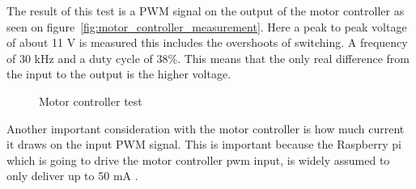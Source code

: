 The result of this test is a PWM signal on the output of the motor controller as seen on figure~\ref{fig:motor_controller_measurement}. Here a peak to peak voltage of about 11 V is measured this includes the overshoots of switching. A frequency of 30 kHz and a duty cycle of 38\%. This means that the only real difference from the input to the output is the higher voltage.
\begin{figure}[H]
	\centering
	\hfill
	\hfill
	\caption{Motor controller test}
\end{figure}

Another important consideration with the motor controller is how much current it draws on the input PWM signal. This is important because the Raspberry pi which is going to drive the motor controller pwm input, is widely assumed to only deliver up to 50 mA \cite{rpi-current}.


